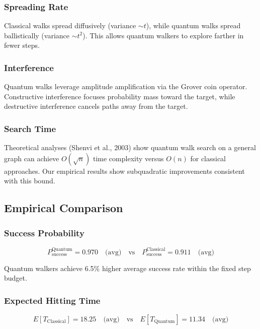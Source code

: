 \documentclass[12pt,a4paper]{article}
\begin{document}
\subsubsection{Spreading Rate}
Classical walks spread diffusively (variance $\sim t$), while quantum walks spread ballistically (variance $\sim t^2$). This allows quantum walkers to explore farther in fewer steps.

\subsubsection{Interference}
Quantum walks leverage amplitude amplification via the Grover coin operator. Constructive interference focuses probability mass toward the target, while destructive interference cancels paths away from the target.

\subsubsection{Search Time}
Theoretical analyses (Shenvi et al., 2003) show quantum walk search on a general graph can achieve $O(\sqrt{n})$ time complexity versus $O(n)$ for classical approaches. Our empirical results show subquadratic improvements consistent with this bound.

\subsection{Empirical Comparison}

\subsubsection{Success Probability}
\begin{equation}
P_{\text{success}}^{\text{Quantum}} = 0.970 \quad \text{(avg)} \quad \text{vs} \quad P_{\text{success}}^{\text{Classical}} = 0.911 \quad \text{(avg)}
\end{equation}

Quantum walkers achieve 6.5\% higher average success rate within the fixed step budget.

\subsubsection{Expected Hitting Time}
\begin{equation}
E[T_{\text{Classical}}] = 18.25 \quad \text{(avg)} \quad \text{vs} \quad E[T_{\text{Quantum}}] = 11.34 \quad \text{(avg)}
\end{equation}
\end{document}
